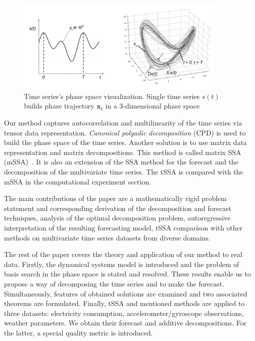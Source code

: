 \documentclass[referee, pdflatex, sn-mathphys-num]{sn-jnl}
\theoremstyle{definition}
\theoremstyle{plain}
\begin{document}
	\begin{figure}[!htbp]
		\centering
		\includegraphics[width=0.9\textwidth, keepaspectratio]{phase_traj.png}
		\caption{Time series's phase space visualization. Single time series $ s(t) $ builds phase trajectory $ \mathbf{x}_t $ in a 3-dimensional phase space}\label{pic:phase_traj}
	\end{figure}
	
	Our method captures autocorrelation and multilinearity of the time series via tensor data representation. \emph{Canonical polyadic decomposition} (CPD) is used to build the phase space of the time series. Another solution is to use matrix data representation and matrix decompositions. This method is called matrix SSA (mSSA)~\cite{mSSA_overview}. It is also an extension of the SSA method for the forecast and the decomposition of the multivariate time series. The tSSA is compared with the mSSA in the computational experiment section.
	
	The main contributions of the paper are a mathematically rigid problem statement and corresponding derivation of the decomposition and forecast techniques, analysis of the optimal decomposition problem, autoregressive interpretation of the resulting forecasting model, tSSA comparison with other methods on multivariate time series datasets from diverse domains.
	
	The rest of the paper covers the theory and application of our method to real data. Firstly, the dynamical systems model is introduced and the problem of basis search in the phase space is stated and resolved. These results enable us to propose a way of decomposing the time series and to make the forecast. Simultaneously, features of obtained solutions are examined and two associated theorems are formulated. Finally, tSSA and mentioned methods are applied to three datasets: electricity consumption, accelerometer/gyroscope observations, weather parameters. We obtain their forecast and additive decompositions. For the latter, a special quality metric is introduced.
	
\end{document}

